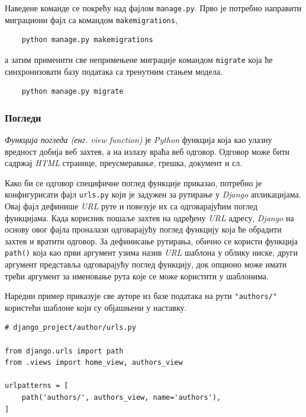 \documentclass[12pt,oneside]{memoir}
\begin{document}
Наведене команде се покрећу над фајлом \texttt{manage.py}. Прво је потребно направити миграциони фајл са командом \texttt{makemigrations},
\begin{lstlisting}
    python manage.py makemigrations
\end{lstlisting}
а затим применити све непримењене миграције командом \texttt{migrate} која ће синхронизовати базу података са тренутним стањем модела.
\begin{lstlisting}
    python manage.py migrate
\end{lstlisting}

\subsubsection{Погледи}\label{django:url_routing}

\textit{Функција погледа (енг. view function)} \cite{django_doc_views} је \textit{Python} функција која као улазну вредност добија веб захтев, а на излазу враћа веб одговор. Одговор може бити садржај \textit{HTML} странице, преусмеравање, грешка, документ и сл. 

Како би се одговор специфичне поглед функције приказао, потребно је конфигурисати фајл \texttt{urls.py} који је задужен за рутирање у \textit{Django} апликацијама. Овај фајл дефинише \textit{URL} руте и повезује их са одговарајућим поглед функцијама. Када корисник пошаље захтев на одређену \textit{URL} адресу, \textit{Django} на основу овог фајла проналази одговарајућу поглед функцију која ће обрадити захтев и вратити одговор. За дефинисање рутирања, обично се користи функција \texttt{path()} која као први аргумент узима назив \textit{URL} шаблона у облику ниске, други аргумент представља одговарајућу поглед функцију, док опционо може имати трећи аргумент за именовање рута које се може користити у шаблонима.

Наредни пример приказује све ауторе из базе података на рути \texttt{"authors/"} користећи шаблоне који су објашњени у наставку.

\begin{lstlisting}
# django_project/author/urls.py

from django.urls import path
from .views import home_view, authors_view

urlpatterns = [
    path('authors/', authors_view, name='authors'),
]
\end{lstlisting}
\end{document}
